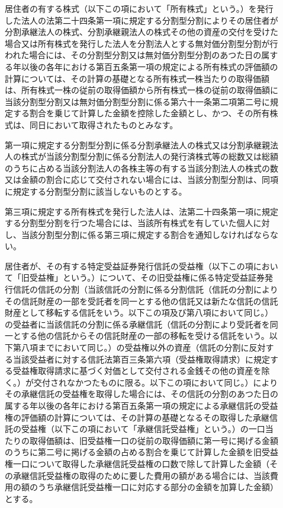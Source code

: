 \documentclass[twocolumn,a4j,10pt]{ltjtarticle}
\begin{document}
\begin{description}
\item[]居住者の有する株式（以下この項において「所有株式」という。）を発行した法人の法第二十四条第一項に規定する分割型分割によりその居住者が分割承継法人の株式、分割承継親法人の株式その他の資産の交付を受けた場合又は所有株式を発行した法人を分割法人とする無対価分割型分割が行われた場合には、その分割型分割又は無対価分割型分割のあつた日の属する年以後の各年における第百五条第一項の規定による所有株式の評価額の計算については、その計算の基礎となる所有株式一株当たりの取得価額は、所有株式一株の従前の取得価額から所有株式一株の従前の取得価額に当該分割型分割又は無対価分割型分割に係る第六十一条第二項第二号に規定する割合を乗じて計算した金額を控除した金額とし、かつ、その所有株式は、同日において取得されたものとみなす。
\item[]第一項に規定する分割型分割に係る分割承継法人の株式又は分割承継親法人の株式が当該分割型分割に係る分割法人の発行済株式等の総数又は総額のうちに占める当該分割法人の各株主等の有する当該分割法人の株式の数又は金額の割合に応じて交付されない場合には、当該分割型分割は、同項に規定する分割型分割に該当しないものとする。
\item[]第三項に規定する所有株式を発行した法人は、法第二十四条第一項に規定する分割型分割を行つた場合には、当該所有株式を有していた個人に対し、当該分割型分割に係る第三項に規定する割合を通知しなければならない。
\item[]居住者が、その有する特定受益証券発行信託の受益権（以下この項において「旧受益権」という。）について、その旧受益権に係る特定受益証券発行信託の信託の分割（当該信託の分割に係る分割信託（信託の分割によりその信託財産の一部を受託者を同一とする他の信託又は新たな信託の信託財産として移転する信託をいう。以下この項及び第八項において同じ。）の受益者に当該信託の分割に係る承継信託（信託の分割により受託者を同一とする他の信託からその信託財産の一部の移転を受ける信託をいう。以下第八項までにおいて同じ。）の受益権以外の資産（信託の分割に反対する当該受益者に対する信託法第百三条第六項（受益権取得請求）に規定する受益権取得請求に基づく対価として交付される金銭その他の資産を除く。）が交付されなかつたものに限る。以下この項において同じ。）によりその承継信託の受益権を取得した場合には、その信託の分割のあつた日の属する年以後の各年における第百五条第一項の規定による承継信託の受益権の評価額の計算については、その計算の基礎となるその取得した承継信託の受益権（以下この項において「承継信託受益権」という。）の一口当たりの取得価額は、旧受益権一口の従前の取得価額に第一号に掲げる金額のうちに第二号に掲げる金額の占める割合を乗じて計算した金額を旧受益権一口について取得した承継信託受益権の口数で除して計算した金額（その承継信託受益権の取得のために要した費用の額がある場合には、当該費用の額のうち承継信託受益権一口に対応する部分の金額を加算した金額）とする。

\end{description}
\end{document}
